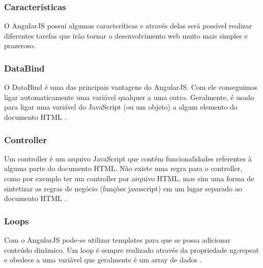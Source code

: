 \subsubsection{Características}

\par O AngularJS possui algumas caracteríticas e através delas será possível
realizar diferentes tarefas que irão tornar o desenvolvimento web muito mais simples e prazeroso.

\subsubsection{DataBind}

\par O DataBind é uma das principais vantagens do AngularJS.
Com ele conseguimos ligar automaticamente uma variável qualquer a uma outra.
Geralmente, é usado para ligar uma variável do JavaScript (ou um objeto) a algum
elemento do documento HTML \cite{livro_java_Guia_do_Programador}.

\subsubsection{Controller}

\par Um controller é um arquivo JavaScript que contém funcionalidades
referentes à alguma parte do documento HTML.
Não existe uma regra para o controller, como por exemplo
ter um controller por arquivo HTML, mas sim uma forma de sintetizar as regras de negócio (funções
javascript) em um lugar separado ao documento HTML
\cite{livro_java_Guia_do_Programador}.

\subsubsection{Loops}

\par Com o AngularJS pode-se utilizar templates para que se possa
adicionar conteúdo dinâmico. Um loop é sempre realizado através da propriedade ng-repeat e obedece a uma variável
que geralmente é um array de dados \cite{livro_java_Guia_do_Programador}.


